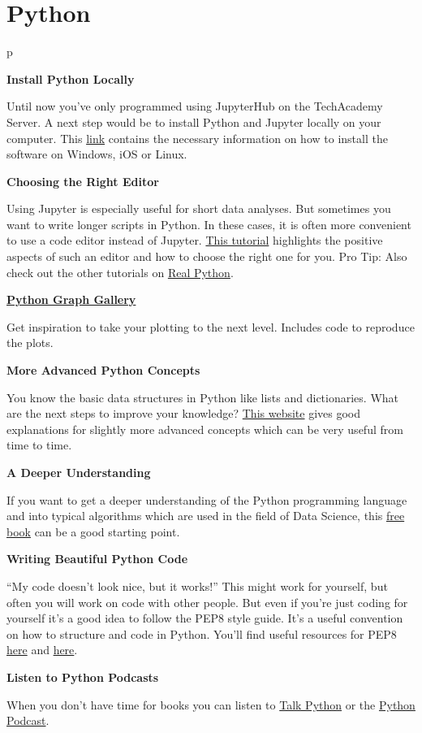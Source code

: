 \documentclass[
  11pt,
]{book}
\begin{document}
\hypertarget{python}{%
\section{Python}\label{python}}

\begin{tipsp}p

\textbf{Install Python Locally}

Until now you've only programmed using JupyterHub on the TechAcademy
Server. A next step would be to install Python and Jupyter locally on
your computer. This
\href{https://docs.anaconda.com/anaconda/install/}{link} contains the
necessary information on how to install the software on Windows, iOS or
Linux.

\textbf{Choosing the Right Editor}

Using Jupyter is especially useful for short data analyses. But
sometimes you want to write longer scripts in Python. In these cases, it
is often more convenient to use a code editor instead of Jupyter.
\href{https://realpython.com/learning-paths/perfect-your-python-development-setup/}{This
tutorial} highlights the positive aspects of such an editor and how to
choose the right one for you. Pro Tip: Also check out the other
tutorials on \href{https://realpython.com/}{Real Python}.

\textbf{\href{https://python-graph-gallery.com/}{Python Graph Gallery}}

Get inspiration to take your plotting to the next level. Includes code
to reproduce the plots.

\textbf{More Advanced Python Concepts}

You know the basic data structures in Python like lists and
dictionaries. What are the next steps to improve your knowledge?
\href{https://book.pythontips.com/en/latest/index.html}{This website}
gives good explanations for slightly more advanced concepts which can be
very useful from time to time.

\textbf{A Deeper Understanding}

If you want to get a deeper understanding of the Python programming
language and into typical algorithms which are used in the field of Data
Science, this
\href{https://github.com/ab-anand/py-books/blob/master/Data\%20Science\%20from\%20Scratch-\%20First\%20Principles\%20with\%20Python.pdf}{free
book} can be a good starting point.

\textbf{Writing Beautiful Python Code}

``My code doesn't look nice, but it works!'' This might work for
yourself, but often you will work on code with other people. But even if
you're just coding for yourself it's a good idea to follow the PEP8
style guide. It's a useful convention on how to structure and code in
Python. You'll find useful resources for PEP8
\href{https://realpython.com/python-pep8/}{here} and
\href{https://www.python.org/dev/peps/pep-0020/\#id2}{here}.

\textbf{Listen to Python Podcasts}

When you don't have time for books you can listen to
\href{https://talkpython.fm/home}{Talk Python} or the
\href{https://www.pythonpodcast.com}{Python Podcast}.

\end{tipsp}

\backmatter
\end{document}

